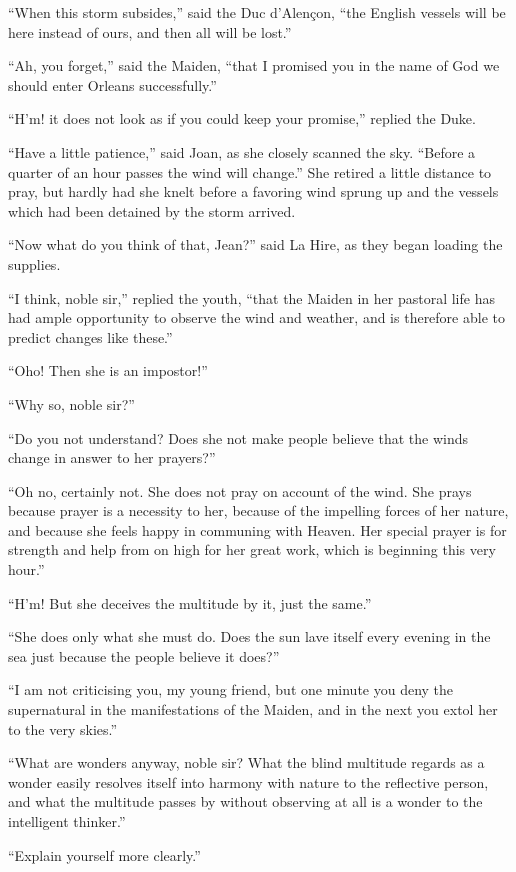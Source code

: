 ``When this storm subsides,'' said the Duc d'Alençon, ``the English
vessels will be here instead of ours, and then all will be lost.''

``Ah, you forget,'' said the Maiden, ``that I promised you in the name
of God we should enter Orleans successfully.''

``H'm! it does not look as if you could keep your promise,'' replied the
Duke.

``Have a little patience,'' said Joan, as she closely scanned the sky.
``Before a quarter of an hour passes the wind will change.'' She retired
a little distance to pray, but hardly had she knelt before a favoring
wind sprung up and the vessels which had been detained by the storm
arrived.

``Now what do you think of that, Jean?'' said La Hire, as they began
loading the supplies.

``I think, noble sir,'' replied the youth, ``that the Maiden in her
pastoral life has had ample opportunity to observe the wind and weather,
and is therefore able to predict changes like these.''

``Oho! Then she is an impostor!''

``Why so, noble sir?''

``Do you not understand? Does she not make people believe that the winds
change in answer to her prayers?''

``Oh no, certainly not. She does not pray on account of the wind. She
prays because prayer is a necessity to her, because of the impelling
forces of her nature, and because she feels happy in communing with
Heaven. Her special prayer is for strength and help from on high for her
great work, which is beginning this very hour.''

``H'm! But she deceives the multitude by it, just the same.''

``She does only what she must do. Does the sun lave itself every evening
in the sea just because the people believe it does?''

``I am not criticising you, my young friend, but one minute you deny the
supernatural in the manifestations of the Maiden, and in the next you
extol her to the very skies.''

``What are wonders anyway, noble sir? What the blind multitude regards
as a wonder easily resolves itself into harmony with nature to the
reflective person, and what the multitude passes by without observing at
all is a wonder to the intelligent thinker.''

``Explain yourself more clearly.''

